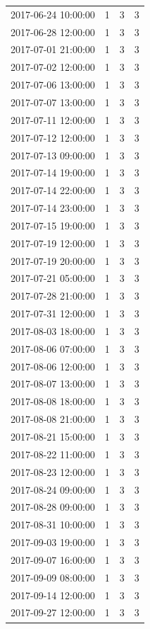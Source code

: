 \begin{tabular}{lrrr}
2017-06-24 10:00:00 & 1 & 3 & 3 \\
2017-06-28 12:00:00 & 1 & 3 & 3 \\
2017-07-01 21:00:00 & 1 & 3 & 3 \\
2017-07-02 12:00:00 & 1 & 3 & 3 \\
2017-07-06 13:00:00 & 1 & 3 & 3 \\
2017-07-07 13:00:00 & 1 & 3 & 3 \\
2017-07-11 12:00:00 & 1 & 3 & 3 \\
2017-07-12 12:00:00 & 1 & 3 & 3 \\
2017-07-13 09:00:00 & 1 & 3 & 3 \\
2017-07-14 19:00:00 & 1 & 3 & 3 \\
2017-07-14 22:00:00 & 1 & 3 & 3 \\
2017-07-14 23:00:00 & 1 & 3 & 3 \\
2017-07-15 19:00:00 & 1 & 3 & 3 \\
2017-07-19 12:00:00 & 1 & 3 & 3 \\
2017-07-19 20:00:00 & 1 & 3 & 3 \\
2017-07-21 05:00:00 & 1 & 3 & 3 \\
2017-07-28 21:00:00 & 1 & 3 & 3 \\
2017-07-31 12:00:00 & 1 & 3 & 3 \\
2017-08-03 18:00:00 & 1 & 3 & 3 \\
2017-08-06 07:00:00 & 1 & 3 & 3 \\
2017-08-06 12:00:00 & 1 & 3 & 3 \\
2017-08-07 13:00:00 & 1 & 3 & 3 \\
2017-08-08 18:00:00 & 1 & 3 & 3 \\
2017-08-08 21:00:00 & 1 & 3 & 3 \\
2017-08-21 15:00:00 & 1 & 3 & 3 \\
2017-08-22 11:00:00 & 1 & 3 & 3 \\
2017-08-23 12:00:00 & 1 & 3 & 3 \\
2017-08-24 09:00:00 & 1 & 3 & 3 \\
2017-08-28 09:00:00 & 1 & 3 & 3 \\
2017-08-31 10:00:00 & 1 & 3 & 3 \\
2017-09-03 19:00:00 & 1 & 3 & 3 \\
2017-09-07 16:00:00 & 1 & 3 & 3 \\
2017-09-09 08:00:00 & 1 & 3 & 3 \\
2017-09-14 12:00:00 & 1 & 3 & 3 \\
2017-09-27 12:00:00 & 1 & 3 & 3 \\

\end{tabular}
